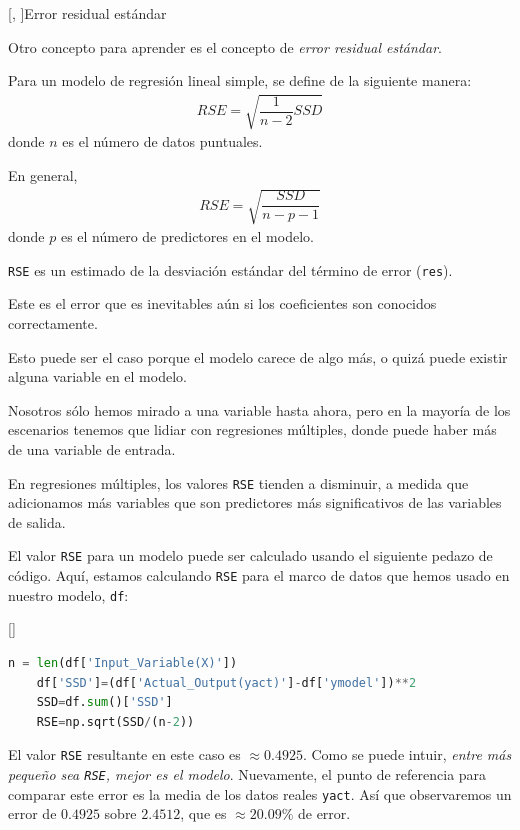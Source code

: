 [, ]{Error residual estándar}

Otro concepto para aprender es el concepto de \emph{error residual estándar}.



Para un modelo de regresión lineal simple, se define de la siguiente manera:
\begin{align}
	RSE = \sqrt{\dfrac{1}{n-2}SSD}
\end{align}
donde $n$ es el número de datos puntuales.



En general,
\begin{align}
	RSE = \sqrt{\dfrac{SSD}{n-p-1}}
\end{align}
donde $p$ es el número de predictores en el modelo.



\texttt{RSE} es un estimado de la desviación estándar del término de error (\texttt{res}).


Este es el error que es inevitables aún si los coeficientes son conocidos correctamente.



Esto puede ser el caso porque el modelo carece de algo más, o quizá puede existir alguna variable en el modelo.



Nosotros sólo hemos mirado a una variable hasta ahora, pero en la mayoría de los escenarios tenemos que lidiar con regresiones múltiples, donde puede haber más de una variable de entrada.



En regresiones múltiples, los valores \texttt{RSE} tienden a disminuir, a medida que adicionamos más variables que son predictores más significativos de las variables de salida.




El valor \texttt{RSE} para un modelo puede ser calculado usando el siguiente pedazo de código. Aquí, estamos calculando \texttt{RSE} para el marco de datos que hemos usado en nuestro modelo, \texttt{df}:


[]{}
\begin{lstlisting}[language=Python]
	n = len(df['Input_Variable(X)'])
	df['SSD']=(df['Actual_Output(yact)']-df['ymodel'])**2
	SSD=df.sum()['SSD']
	RSE=np.sqrt(SSD/(n-2))
\end{lstlisting}



El valor \texttt{RSE} resultante en este caso es $\approx 0.4925$. Como se puede intuir, \emph{entre más pequeño sea \texttt{RSE}, mejor es el modelo}. Nuevamente, el punto de referencia para comparar este error es la media de los datos reales \texttt{yact}. Así que observaremos un error de $0.4925$ sobre $2.4512$, que es $\approx 20.09\%$ de error.

